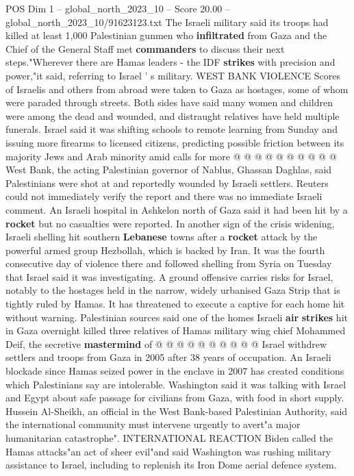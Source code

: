 \begin{textsample}{POS Dim 1 – global\_north\_2023\_10 – Score 20.00 – global\_north\_2023\_10/91623123.txt}
The Israeli military said its troops had killed at least 1,000 Palestinian gunmen who \textbf{infiltrated} from Gaza and the Chief of the General Staff met \textbf{commanders} to discuss their next steps."Wherever there are Hamas leaders - the IDF \textbf{strikes} with precision and power,"it said, referring to Israel ' s military.
WEST BANK VIOLENCE Scores of Israelis and others from abroad were taken to Gaza as hostages, some of whom were paraded through streets.
Both sides have said many women and children were among the dead and wounded, and distraught relatives have held multiple funerals.
Israel said it was shifting schools to remote learning from Sunday and issuing more firearms to licensed citizens, predicting possible friction between its majority Jews and Arab minority amid calls for more @ @ @ @ @ @ @ @ @ @ West Bank, the acting Palestinian governor of Nablus, Ghassan Daghlas, said Palestinians were shot at and reportedly wounded by Israeli settlers.
Reuters could not immediately verify the report and there was no immediate Israeli comment.
An Israeli hospital in Ashkelon north of Gaza said it had been hit by a \textbf{rocket} but no casualties were reported.
In another sign of the crisis widening, Israeli shelling hit southern \textbf{Lebanese} towns after a \textbf{rocket} attack by the powerful armed group Hezbollah, which is backed by Iran.
It was the fourth consecutive day of violence there and followed shelling from Syria on Tuesday that Israel said it was investigating.
A ground offensive carries risks for Israel, notably to the hostages held in the narrow, widely urbanised Gaza Strip that is tightly ruled by Hamas.
It has threatened to execute a captive for each home hit without warning.
Palestinian sources said one of the homes Israeli \textbf{air} \textbf{strikes} hit in Gaza overnight killed three relatives of Hamas military wing chief Mohammed Deif, the secretive \textbf{mastermind} of @ @ @ @ @ @ @ @ @ @ Israel withdrew settlers and troops from Gaza in 2005 after 38 years of occupation.
An Israeli blockade since Hamas seized power in the enclave in 2007 has created conditions which Palestinians say are intolerable.
Washington said it was talking with Israel and Egypt about safe passage for civilians from Gaza, with food in short supply.
Hussein Al-Sheikh, an official in the West Bank-based Palestinian Authority, said the international community must intervene urgently to avert"a major humanitarian catastrophe".
INTERNATIONAL REACTION Biden called the Hamas attacks"an act of sheer evil"and said Washington was rushing military assistance to Israel, including to replenish its Iron Dome aerial defence system.

\end{textsample}
